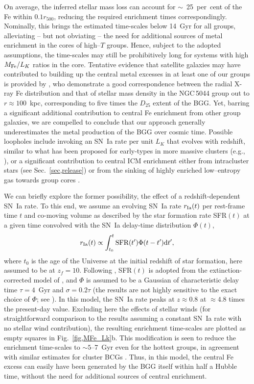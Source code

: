 \documentclass[useAMS,usenatbib]{mn2e}
\begin{document}
On average, the inferred stellar mass loss can account for
$\sim$~25~per~cent of the Fe within $0.1r_{500}$, reducing the
required enrichment times correspondingly. Nominally, this brings the
estimated time-scales below 14~Gyr for all groups, alleviating -- but
not obviating -- the need for additional sources of metal enrichment
in the cores of high--$T$ groups. Hence, subject to the adopted
assumptions, the time-scales may still be prohibitively long for
systems with high $M_{\rm Fe}/L_K$ ratios in the core. Tentative
evidence that satellite galaxies may have contributed to building up
the central metal excesses in at least one of our groups is provided
by \citet{mend09}, who demonstrate a good correspondence between the
radial X-ray Fe distribution and that of stellar mass density in the
NGC\,5044 group out to $r\approx 100$~kpc, corresponding to five times
the $D_{25}$ extent of the BGG. Yet, barring a significant additional
contribution to central Fe enrichment from other group galaxies, we
are compelled to conclude that our approach generally underestimates
the metal production of the BGG over cosmic time.  Possible loopholes
include invoking an SN~Ia rate per unit $L_K$ that evolves with
redshift, similar to what has been proposed for early-types in more
massive clusters (e.g., \citealt{renz93,boeh04}), or a significant
contribution to central ICM enrichment either from intracluster stars
(see Sec.~\ref{sec,release}) or from the sinking of highly enriched
low--entropy gas towards group cores \citep{cora06}.

We can briefly explore the former possibility, the effect of a
redshift-dependent SN~Ia rate. To this end, we assume an evolving
SN~Ia rate $r_{\rm Ia}(t)$ per rest-frame time $t$ and co-moving
volume as described by the star formation rate SFR$(t)$ at a given
time convolved with the SN~Ia delay-time distribution $\Phi(t)$,
\begin{equation}
  r_{\rm Ia}(t) \propto \int_{t_0}^{t} \mbox{SFR}(t')\Phi(t-t')\mbox{d}t',
\label{eq,snia}
\end{equation}
where $t_0$ is the age of the Universe at the initial redshift of star
formation, here assumed to be at $z_f = 10$.  Following
\citet{etto05}, SFR$(t)$ is adopted from the extinction-corrected
model of \citet{stro04}, and $\Phi$ is assumed to be a Gaussian of
characteristic delay time $\tau=4$~Gyr and $\sigma = 0.2\tau$ (the
results are not highly sensitive to the exact choice of $\Phi$; see
\citealt{etto05}). In this model, the SN~Ia rate peaks at $z\approx
0.8$ at $\approx 4.8$ times the present-day value. Excluding here the
effects of stellar winds (for straightforward comparison to the
results assuming a constant SN~Ia rate with no stellar wind
contribution), the resulting enrichment time-scales are plotted as
empty squares in Fig.~\ref{fig,MFe_Lk}b.  This modification is seen to
reduce the enrichment time-scales to $\sim 5$--7~Gyr even for the
hottest groups, in agreement with similar estimates for cluster BCGs
\citep{boeh04}.  Thus, in this model, the central Fe excess can easily
have been generated by the BGG itself within half a Hubble time,
without the need for additional sources of central enrichment.
\end{document}
